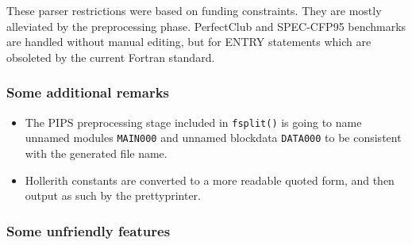 \documentclass[a4paper]{report}
\begin{document}
These parser restrictions were based on funding constraints. They are
mostly alleviated by the preprocessing phase. PerfectClub and SPEC-CFP95
benchmarks are handled without manual editing, but for ENTRY statements
which are obsoleted by the current Fortran standard.


\subsubsection{Some additional remarks}

\begin{itemize}
\item The PIPS preprocessing stage included in \texttt{fsplit()} is going
  to name unnamed modules \texttt{MAIN000} and unnamed  blockdata
  \texttt{DATA000} to be consistent with the generated file name.
 
\item Hollerith constants are converted to a more readable quoted form,
  and then output as such by the prettyprinter.

\end{itemize}

\subsubsection{Some unfriendly features}
\end{document}
